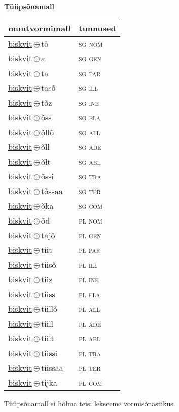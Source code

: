 

\vspace{3.5em}
\noindent \begin{minipage}{\textwidth}
\noindent \textbf{Tüüpsõnamall \,}\\

\begin{sideways}
\begin{tabular}{l l}
muutvormimall & tunnused \\
\hline
\underline{biskvit}\,$\oplus$\,tõ & \textsc{ sg nom } \\
\underline{biskvit}\,$\oplus$\,a & \textsc{ sg gen } \\
\underline{biskvit}\,$\oplus$\,ta & \textsc{ sg par } \\
\underline{biskvit}\,$\oplus$\,tasõ & \textsc{ sg ill } \\
\underline{biskvit}\,$\oplus$\,tõz & \textsc{ sg ine } \\
\underline{biskvit}\,$\oplus$\,õss & \textsc{ sg ela } \\
\underline{biskvit}\,$\oplus$\,õllõ & \textsc{ sg all } \\
\underline{biskvit}\,$\oplus$\,õll & \textsc{ sg ade } \\
\underline{biskvit}\,$\oplus$\,õlt & \textsc{ sg abl } \\
\underline{biskvit}\,$\oplus$\,õssi & \textsc{ sg tra } \\
\underline{biskvit}\,$\oplus$\,tõssaa & \textsc{ sg ter } \\
\underline{biskvit}\,$\oplus$\,õka & \textsc{ sg com } \\
\underline{biskvit}\,$\oplus$\,õd & \textsc{ pl nom } \\
\underline{biskvit}\,$\oplus$\,tajõ & \textsc{ pl gen } \\
\underline{biskvit}\,$\oplus$\,tiit & \textsc{ pl par } \\
\underline{biskvit}\,$\oplus$\,tiisõ & \textsc{ pl ill } \\
\underline{biskvit}\,$\oplus$\,tiiz & \textsc{ pl ine } \\
\underline{biskvit}\,$\oplus$\,tiiss & \textsc{ pl ela } \\
\underline{biskvit}\,$\oplus$\,tiillõ & \textsc{ pl all } \\
\underline{biskvit}\,$\oplus$\,tiill & \textsc{ pl ade } \\
\underline{biskvit}\,$\oplus$\,tiilt & \textsc{ pl abl } \\
\underline{biskvit}\,$\oplus$\,tiissi & \textsc{ pl tra } \\
\underline{biskvit}\,$\oplus$\,tiissaa & \textsc{ pl ter } \\
\underline{biskvit}\,$\oplus$\,tijka & \textsc{ pl com } \\
\end{tabular}
\end{sideways}
\label{tab:tüüpsõnamall-biskvittõ}

\end{minipage}

 
\vspace{1em}
\noindent Tüüpsõnamall  ei hõlma teisi lekseeme vormi\-sõnastikus.
